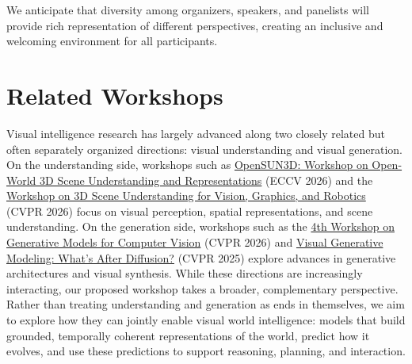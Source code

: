 \documentclass[11pt]{article}
\begin{document}
We anticipate that diversity among organizers, speakers, and panelists will provide rich representation of different perspectives, creating an inclusive and welcoming environment for all participants.


\section{Related Workshops}

Visual intelligence research has largely advanced along two closely related but often separately organized directions: visual understanding and visual generation. On the understanding side, workshops such as \href{https://opensun3d.github.io/}{OpenSUN3D: Workshop on Open-World 3D Scene Understanding and Representations} (ECCV 2026) and the \href{https://scene-understanding.com/}{Workshop on 3D Scene Understanding for Vision, Graphics, and Robotics} (CVPR 2026) focus on visual perception, spatial representations, and scene understanding. On the generation side, workshops such as the \href{https://generative-vision.github.io/workshop-CVPR-26/}{4th Workshop on Generative Models for Computer Vision} (CVPR 2026) and \href{https://vgm-cvpr.github.io/}{Visual Generative Modeling: What's After Diffusion?} (CVPR 2025) explore advances in generative architectures and visual synthesis. While these directions are increasingly interacting, our proposed workshop takes a broader, complementary perspective. Rather than treating understanding and generation as ends in themselves, we aim to explore how they can jointly enable visual world intelligence: models that build grounded, temporally coherent representations of the world, predict how it evolves, and use these predictions to support reasoning, planning, and interaction.
\end{document}
